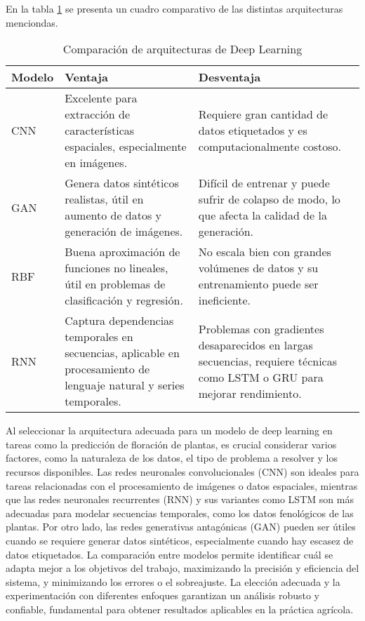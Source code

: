 En la tabla \ref{tab:redes_dl} se presenta un cuadro comparativo de las distintas arquitecturas menciondas.

\begin{table}[h]
    \centering
    \caption{Comparación de arquitecturas de Deep Learning}
    \renewcommand{\arraystretch}{1} %
    \begin{tabular}{|>{\raggedright}m{2cm}|m{5cm}|m{5cm}|} %
        \hline
        \textbf{\large Modelo} & \textbf{\large Ventaja} & \textbf{\large Desventaja} \\
        \hline
        \large CNN & \large Excelente para extracción de características espaciales, especialmente en imágenes. 
		& \large Requiere gran cantidad de datos etiquetados y es computacionalmente costoso. \\
        \hline
        \large GAN & \large Genera datos sintéticos realistas, útil en aumento de datos y generación de imágenes. 
		& \large Difícil de entrenar y puede sufrir de colapso de modo, lo que afecta la calidad de la generación. \\
        \hline
        \large RBF & \large Buena aproximación de funciones no lineales, útil en problemas de clasificación y regresión.
		 & \large No escala bien con grandes volúmenes de datos y su entrenamiento puede ser ineficiente. \\
        \hline
        \large RNN & \large Captura dependencias temporales en secuencias, aplicable en procesamiento de lenguaje natural 
		y series temporales. & \large Problemas con gradientes desaparecidos en largas secuencias, requiere técnicas como 
		LSTM o GRU para mejorar rendimiento.\\
        \hline
    \end{tabular}
    \label{tab:redes_dl}
\end{table}


	Al seleccionar la arquitectura adecuada para un modelo de deep learning en tareas como la predicción de
	floración de plantas, es crucial considerar varios factores, como la naturaleza de los datos, el tipo
	de problema a resolver y los recursos disponibles. Las redes neuronales convolucionales (CNN) son 
  	ideales para tareas relacionadas con el procesamiento de imágenes o datos espaciales, mientras que 
  	las redes neuronales recurrentes (RNN) y sus variantes como LSTM son más adecuadas para modelar 
  	secuencias temporales, como los datos fenológicos de las plantas. Por otro lado, las redes generativas
   	antagónicas (GAN) pueden ser útiles cuando se requiere generar datos sintéticos, especialmente 
   	cuando hay escasez de datos etiquetados. La comparación entre modelos permite identificar cuál se adapta
	mejor a los objetivos del trabajo, maximizando la precisión y eficiencia del sistema, y 
	minimizando los errores o el sobreajuste. La elección adecuada y la experimentación con diferentes
	enfoques garantizan un análisis robusto y confiable, fundamental para obtener resultados
	aplicables en la práctica agrícola.

